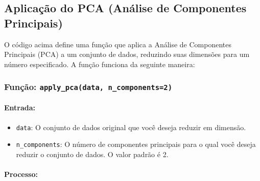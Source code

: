 \documentclass[11pt]{article}
\providecommand{\tightlist}{%
      \setlength{\itemsep}{0pt}\setlength{\parskip}{0pt}}
\begin{document}
    \hypertarget{aplicauxe7uxe3o-do-pca-anuxe1lise-de-componentes-principais}{%
\subsection{Aplicação do PCA (Análise de Componentes
Principais)}\label{aplicauxe7uxe3o-do-pca-anuxe1lise-de-componentes-principais}}

O código acima define uma função que aplica a Análise de Componentes
Principais (PCA) a um conjunto de dados, reduzindo suas dimensões para
um número especificado. A função funciona da seguinte maneira:

\hypertarget{funuxe7uxe3o-apply_pcadata-n_components2}{%
\subsubsection{\texorpdfstring{Função:
\texttt{apply\_pca(data,\ n\_components=2)}}{Função: apply\_pca(data, n\_components=2)}}\label{funuxe7uxe3o-apply_pcadata-n_components2}}

\hypertarget{entrada}{%
\paragraph{\texorpdfstring{\textbf{Entrada:}}{Entrada:}}\label{entrada}}

\begin{itemize}
\tightlist
\item
  \texttt{data}: O conjunto de dados original que você deseja reduzir em
  dimensão.
\item
  \texttt{n\_components}: O número de componentes principais para o qual
  você deseja reduzir o conjunto de dados. O valor padrão é 2.
\end{itemize}

\hypertarget{processo}{%
\paragraph{\texorpdfstring{\textbf{Processo:}}{Processo:}}\label{processo}}
\end{document}
